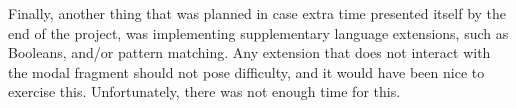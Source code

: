 \documentclass[12pt,twoside,openright]{report}
\numberwithin{equation}{chapter}
\numberwithin{figure}{chapter}
\numberwithin{table}{chapter}
\theoremstyle{definition}\newtheorem{definition}{Definition}
\begin{document}
Finally,
another thing that was planned in case extra time presented itself by the end of the project,
was implementing supplementary language extensions,
such as Booleans, and/or pattern matching.
Any extension that does not interact with the modal fragment should not pose difficulty,
and it would have been nice to exercise this.
Unfortunately, there was not enough time for this.

\cleardoublepage
\printbibliography[heading=bibintoc]
\end{document}
